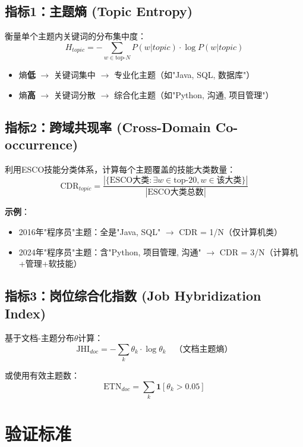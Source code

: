 \documentclass[12pt, a4paper]{ctexart}
\begin{document}
\subsection{指标1：主题熵 (Topic Entropy)}

衡量单个主题内关键词的分布集中度：
\[
H_{topic} = -\sum_{w \in \text{top-}N} P(w|topic) \cdot \log P(w|topic)
\]

\begin{itemize}
    \item 熵\textbf{低} $\rightarrow$ 关键词集中 $\rightarrow$ 专业化主题（如"Java, SQL, 数据库"）
    \item 熵\textbf{高} $\rightarrow$ 关键词分散 $\rightarrow$ 综合化主题（如"Python, 沟通, 项目管理"）
\end{itemize}

\subsection{指标2：跨域共现率 (Cross-Domain Co-occurrence)}

利用ESCO技能分类体系，计算每个主题覆盖的技能大类数量：
\[
\text{CDR}_{topic} = \frac{|\{\text{ESCO大类} : \exists w \in \text{top-}20, w \in \text{该大类}\}|}{|\text{ESCO大类总数}|}
\]

\textbf{示例}：
\begin{itemize}
    \item 2016年"程序员"主题：全是"Java, SQL" $\rightarrow$ CDR = 1/N（仅计算机类）
    \item 2024年"程序员"主题：含"Python, 项目管理, 沟通" $\rightarrow$ CDR = 3/N（计算机+管理+软技能）
\end{itemize}

\subsection{指标3：岗位综合化指数 (Job Hybridization Index)}

基于文档-主题分布$\theta$计算：
\[
\text{JHI}_{doc} = -\sum_{k} \theta_k \cdot \log \theta_k \quad \text{（文档主题熵）}
\]

或使用有效主题数：
\[
\text{ETN}_{doc} = \sum_{k} \mathbf{1}[\theta_k > 0.05]
\]

\section{验证标准}
\end{document}

